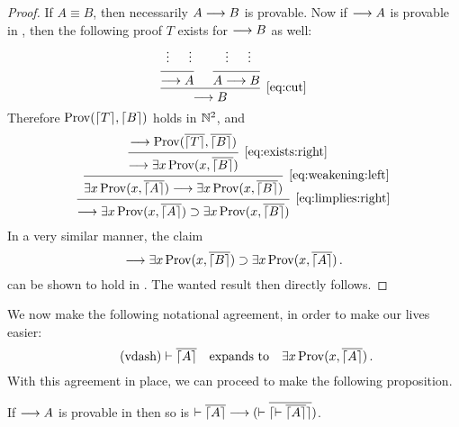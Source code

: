 \documentclass[11pt,a4paper]{article}
\begin{document}
\begin{proof}
    If \(A\equiv B\), then necessarily \(A\longrightarrow B\) is provable.
    Now if \(\longrightarrow A\) is provable in \PA, then the following
    proof \(T\) exists for \(\longrightarrow B\) as well:
    \begin{equation*}
        \begin{prooftree}
            \hypo{}
            \ellipsis{}{}
            \hypo{}
            \ellipsis{}{}
            \infer2{\seq A}
            \hypo{}
            \ellipsis{}{}
            \hypo{}
            \ellipsis{}{}
            \infer2{A\seq B}
            \infer2[\eqref{eq:cut}]{\seq B}
        \end{prooftree}
    \end{equation*}
    Therefore \(\operatorname{Prov}(\lceil T\rceil, \lceil B\rceil)\) holds in \(\mathbb{N}^2\),
    and
    \begin{equation*}
        \begin{prooftree}
            \hypo{\seq\Prov(\num{\G T}, \num{\G B})}
            \infer1[\eqref{eq:exists:right}]{\seq\exists x\Prov(x, \num{\G B})}
            \infer1[\eqref{eq:weakening:left}]{\exists x\Prov(x, \num{\G A})\seq\exists x\Prov(x, \num{\G B})}
            \infer1[\eqref{eq:limplies:right}]{\seq\exists x\Prov(x, \num{\G A})\limplies\exists x\Prov(x, \num{\G B})}
        \end{prooftree}
    \end{equation*}
    In a very similar manner, the claim
    \begin{equation*}
        \longrightarrow\exists x\operatorname{Prov}(x, \overline{\lceil B\rceil})\supset\exists x\operatorname{Prov}(x, \overline{\lceil A\rceil})\,.
    \end{equation*}
    can be shown to hold in \PA{}. The wanted result then directly follows.
\end{proof}

We now make the following notational agreement,
in order to make our lives easier:
\begin{equation}\tag{vdash}\label{eq:vdash}
    \vdash\overline{\lceil A\rceil}
    \quad\text{expands to}\quad
    \exists x\operatorname{Prov}(x, \overline{\lceil A\rceil}) \,.
\end{equation}
With this agreement in place, we can proceed to make the following proposition.

\begin{proposition}[10.9.3]\label{prop:10.9.3}
    If \(\longrightarrow A\) is provable in \PA{,}
    then so is \(\vdash\overline{\lceil A\rceil}\longrightarrow(\vdash\overline{\lceil\vdash\overline{\lceil A\rceil}\rceil})\).
\end{proposition}
\end{document}
